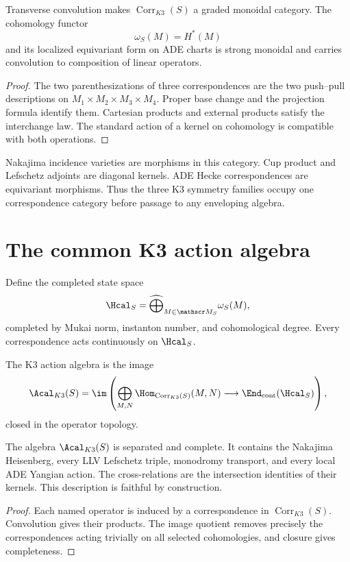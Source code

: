 \begin{theorem}
Transverse convolution makes $\operatorname{Corr}_{K3}(S)$ a graded monoidal category.  The cohomology functor
\[
 \omega_S(M)=H^*(M)
\]
and its localized equivariant form on ADE charts is strong monoidal and carries convolution to composition of linear operators.
\end{theorem}
\begin{proof}
The two parenthesizations of three correspondences are the two push--pull descriptions on $M_1\times M_2\times M_3\times M_4$.  Proper base change and the projection formula identify them.  Cartesian products and external products satisfy the interchange law.  The standard action of a kernel on cohomology is compatible with both operations.
\end{proof}

Nakajima incidence varieties are morphisms in this category.  Cup product and Lefschetz adjoints are diagonal kernels.  ADE Hecke correspondences are equivariant morphisms.  Thus the three K3 symmetry families occupy one correspondence category before passage to any enveloping algebra.

\chapter{The common K3 action algebra}
Define the completed state space
\[
 \Hcal_S=
 \widehat\bigoplus_{M\in\mathscr M_S}\omega_S(M),
\]
completed by Mukai norm, instanton number, and cohomological degree.  Every correspondence acts continuously on $\Hcal_S$.

\begin{definition}
The K3 action algebra is the image
\[
 \Acal_{K3}(S)=
 \im\left(
 \bigoplus_{M,N}\Hom_{\operatorname{Corr}_{K3}(S)}(M,N)
 \longrightarrow\End_{\mathrm{cont}}(\Hcal_S)
 \right),
\]
closed in the operator topology.
\end{definition}

\begin{theorem}
The algebra $\Acal_{K3}(S)$ is separated and complete.  It contains the Nakajima Heisenberg, every LLV Lefschetz triple, monodromy transport, and every local ADE Yangian action.  The cross-relations are the intersection identities of their kernels.  This description is faithful by construction.
\end{theorem}
\begin{proof}
Each named operator is induced by a correspondence in $\operatorname{Corr}_{K3}(S)$.  Convolution gives their products.  The image quotient removes precisely the correspondences acting trivially on all selected cohomologies, and closure gives completeness.
\end{proof}

